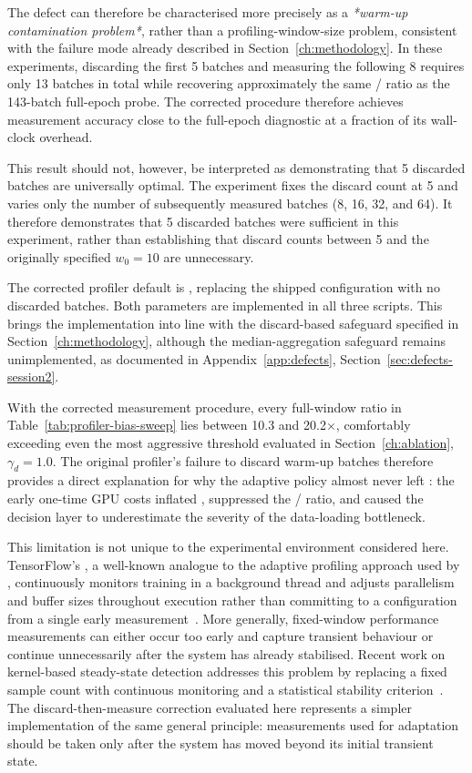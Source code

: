 The defect can therefore be characterised more precisely as a \emph{*warm-up contamination problem*}, rather than a profiling-window-size problem, consistent with the failure mode already described in Section~\ref{ch:methodology}. In these experiments, discarding the first 5 batches and measuring the following 8 requires only 13 batches in total while recovering approximately the same \Tdata{}/\Tgpu{} ratio as the 143-batch full-epoch probe. The corrected procedure therefore achieves measurement accuracy close to the full-epoch diagnostic at a fraction of its wall-clock overhead.

This result should not, however, be interpreted as demonstrating that 5 discarded batches are universally optimal. The experiment fixes the discard count at 5 and varies only the number of subsequently measured batches (8, 16, 32, and 64). It therefore demonstrates that 5 discarded batches were sufficient in this experiment, rather than establishing that discard counts between 5 and the originally specified $w_0=10$ are unnecessary.

The corrected profiler default is , replacing the shipped  configuration with no discarded batches. Both parameters are implemented in all three  scripts. This brings the implementation into line with the discard-based safeguard specified in Section~\ref{ch:methodology}, although the median-aggregation safeguard remains unimplemented, as documented in Appendix~\ref{app:defects}, Section~\ref{sec:defects-session2}.

With the corrected measurement procedure, every full-window ratio in Table~\ref{tab:profiler-bias-sweep} lies between 10.3 and 20.2$\times$, comfortably exceeding even the most aggressive threshold evaluated in Section~\ref{ch:ablation}, $\gamma_d=1.0$. The original profiler's failure to discard warm-up batches therefore provides a direct explanation for why the adaptive policy almost never left : the early one-time GPU costs inflated \Tgpu{}, suppressed the \Tdata{}/\Tgpu{} ratio, and caused the decision layer to underestimate the severity of the data-loading bottleneck.

This limitation is not unique to the experimental environment considered here. TensorFlow's  , a well-known analogue to the adaptive profiling approach used by \pads{}, continuously monitors training in a background thread and adjusts parallelism and buffer sizes throughout execution rather than committing to a configuration from a single early measurement~\cite{Murray21}. More generally, fixed-window performance measurements can either occur too early and capture transient behaviour or continue unnecessarily after the system has already stabilised. Recent work on kernel-based steady-state detection addresses this problem by replacing a fixed sample count with continuous monitoring and a statistical stability criterion~\cite{Beseda25}. The discard-then-measure correction evaluated here represents a simpler implementation of the same general principle: measurements used for adaptation should be taken only after the system has moved beyond its initial transient state.

